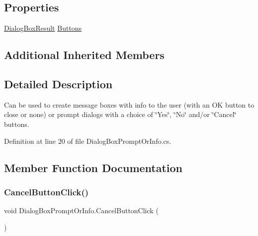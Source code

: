 \subsection*{Properties}
\begin{DoxyCompactItemize}
\item 
\hyperlink{_dialog_box_result_8cs_acd933b66f7b1c8ad36ee61780622c54f}{Dialog\+Box\+Result} \hyperlink{class_dialog_box_prompt_or_info_a83bf411cf5714a5bc53999fd72ddeb97}{Buttons}
\end{DoxyCompactItemize}
\subsection*{Additional Inherited Members}


\subsection{Detailed Description}
Can be used to create message boxes with info to the user (with an OK button to close or none) or prompt dialogs with a choice of \char`\"{}\+Yes\char`\"{}, \char`\"{}\+No\char`\"{} and/or \char`\"{}\+Cancel\char`\"{} buttons. 



Definition at line 20 of file Dialog\+Box\+Prompt\+Or\+Info.\+cs.



\subsection{Member Function Documentation}
\mbox{\label{class_dialog_box_prompt_or_info_a085993f7345873bb6cdc71c0f0ca955e}} 
\subsubsection{\texorpdfstring{Cancel\+Button\+Click()}{CancelButtonClick()}}
{\footnotesize\ttfamily void Dialog\+Box\+Prompt\+Or\+Info.\+Cancel\+Button\+Click (\begin{DoxyParamCaption}{ }\end{DoxyParamCaption})}



